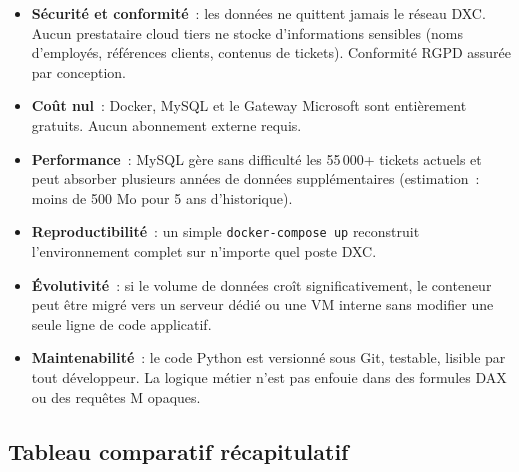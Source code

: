 \documentclass[12pt, a4paper]{article}
\begin{document}
\begin{greenbox}
\begin{itemize}[leftmargin=1.5em, itemsep=4pt]
  \item \textbf{Sécurité et conformité}~: les données ne quittent jamais le
        réseau DXC. Aucun prestataire cloud tiers ne stocke d'informations
        sensibles (noms d'employés, références clients, contenus de tickets).
        Conformité RGPD assurée par conception.
  \item \textbf{Coût nul}~: Docker, MySQL et le Gateway Microsoft sont
        entièrement gratuits. Aucun abonnement externe requis.
  \item \textbf{Performance}~: MySQL gère sans difficulté les 55\,000+ tickets
        actuels et peut absorber plusieurs années de données supplémentaires
        (estimation~: moins de 500 Mo pour 5 ans d'historique).
  \item \textbf{Reproductibilité}~: un simple \texttt{docker-compose up}
        reconstruit l'environnement complet sur n'importe quel poste DXC.
  \item \textbf{Évolutivité}~: si le volume de données croît significativement,
        le conteneur peut être migré vers un serveur dédié ou une VM interne
        sans modifier une seule ligne de code applicatif.
  \item \textbf{Maintenabilité}~: le code Python est versionné sous Git,
        testable, lisible par tout développeur. La logique métier n'est pas
        enfouie dans des formules DAX ou des requêtes M opaques.
\end{itemize}
\end{greenbox}

\vspace{0.4cm}

\subsection{Tableau comparatif récapitulatif}
\end{document}
